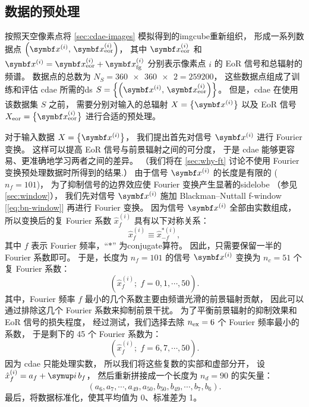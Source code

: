 \subsection{数据的预处理}
\label{sec:preprocessing}

按照天空像素点将 \autoref{sec:cdae-images} 模拟得到的\ac{imgcube}重新组织，
形成一系列数据点 $\left( \B{x}^{(i)}, \,\B{x}^{(i)}_{\R{eor}} \right)$，
其中 $\B{x}^{(i)}_{\R{eor}}$ 和
$\B{x}^{(i)} = \B{x}^{(i)}_{\R{eor}} + \B{x}^{(i)}_{\R{fg}}$
分别表示像素点 $i$ 的 EoR 信号和总辐射的频谱。
数据点的总数为 $N_S = \num{360x360 x 2} = \num{259200}$，
这些数据点组成了训练和评估 \ac{cdae} 所需的\ac{ds}
$S = \left\{ \left(\B{x}^{(i)}, \,\B{x}^{(i)}_{\R{eor}} \right) \right\}$。
但是，\ac{cdae} 在使用该数据集 $S$ 之前，
需要分别对输入的总辐射 $X = \big\{ \B{x}^{(i)} \big\}$
以及 EoR 信号 $X_{\R{eor}} = \big\{ \B{x}^{(i)}_{\R{eor}} \big\}$
进行合适的预处理。

对于输入数据 $X = \big\{ \B{x}^{(i)} \big\}$，
我们提出首先对信号 $\B{x}^{(i)}$ 进行 Fourier 变换。
这样可以提高 EoR 信号与前景辐射之间的可分度，
于是 \ac{cdae} 能够更容易、更准确地学习两者之间的差异。
（我们将在 \autoref{sec:why-ft} 讨论不使用 Fourier 变换预处理数据时所得到的结果.）
由于信号 $\B{x}^{(i)}$ 的长度是有限的 ($n_f = 101$)，
为了抑制信号的边界效应使 Fourier 变换产生显著的\ac{sidelobe}
（参见 \autoref{sec:window}），
我们先对信号 $\B{x}^{(i)}$ 施加 Blackman--Nuttall \ac{f-window}
\cite{chapman2016} [\autoref{eq:bn-window}]
再进行 Fourier 变换。
因为信号 $\B{x}^{(i)}$ 全部由实数组成，
所以变换后的复 Fourier 系数 $\hat{x}^{(i)}_{f}$ 具有以下对称关系：
\begin{equation}
  \hat{x}^{(i)}_{f} \equiv \hat{x}^{*(i)}_{-f} ,
\end{equation}
其中 $f$ 表示 Fourier 频率，\enquote{$*$} 为\ac{conjugate}算符。
因此，只需要保留一半的 Fourier 系数即可。
于是，长度为 $n_f = 101$ 的信号 $\B{x}^{(i)}$ 变换为
$n_c = 51$ 个复 Fourier 系数：
\begin{equation}
  \left( \hat{x}^{(i)}_f; \; f = 0, 1, \cdots, 50 \right) .
\end{equation}
其中，Fourier 频率 $f$ 最小的几个系数主要由频谱光滑的前景辐射贡献，
因此可以通过排除这几个 Fourier 系数来抑制前景干扰。
为了平衡前景辐射的抑制效果和 EoR 信号的损失程度，
经过测试，我们选择去除 $n_{\mathrm{ex}} = 6$ 个 Fourier 频率最小的系数，
于是剩下的 45 个 Fourier 系数为：
\begin{equation}
  \left( \hat{x}^{(i)}_f; \; f = 6, 7, \cdots, 50 \right) .
\end{equation}
因为 \ac{cdae} 只能处理实数，
所以我们将这些复数的实部和虚部分开，
设 $\hat{x}^{(i)}_f = a_f + \Ci\,b_f$，
然后重新拼接成一个长度为 $n_d = 90$ 的实矢量：
\begin{equation}
  (a_6, a_7, \cdots, a_{49}, a_{50},
   b_{50}, b_{49}, \cdots, b_7, b_6) .
\end{equation}
最后，将数据标准化，使其平均值为 0、标准差为 1。

